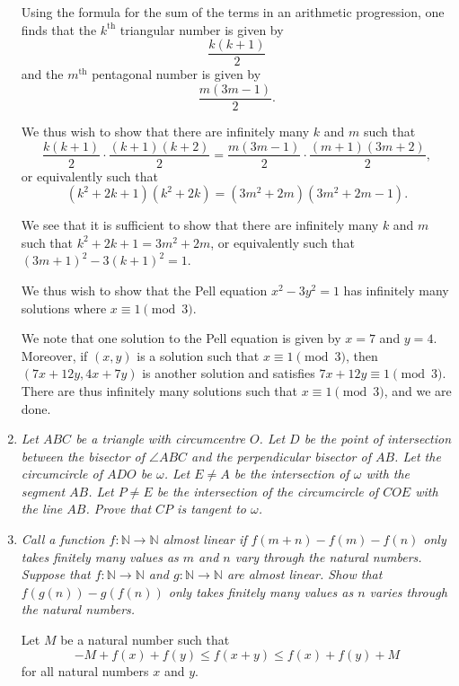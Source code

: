 \documentclass{article}
\begin{document}
\begin{enumerate}[1.]
Using the formula for the sum of the terms in an arithmetic progression, one finds that the $k^\text{th}$ triangular number is given by
\[
	\frac{k(k + 1)}{2}
\]
and the $m^\text{th}$ pentagonal number is given by
\[
	\frac{m(3m - 1)}{2}.
\]

We thus wish to show that there are infinitely many $k$ and $m$ such that
\[
	\frac{k(k + 1)}{2} \cdot \frac{(k + 1)(k + 2)}{2} = \frac{m(3m - 1)}{2} \cdot \frac{(m + 1)(3m + 2)}{2},
\]
or equivalently such that
\[
	(k^2 + 2k + 1)(k^2 + 2k) = (3m^2 + 2m)(3m^2 + 2m - 1).
\]

We see that it is sufficient to show that there are infinitely many $k$ and $m$ such that $k^2 + 2k + 1 = 3m^2 + 2m$, or equivalently such that ${(3m + 1)}^2 - 3{(k + 1)}^2 = 1$.

We thus wish to show that the Pell equation $x^2 - 3y^2 = 1$ has infinitely many solutions where $x \equiv 1 \pmod 3$.

We note that one solution to the Pell equation is given by $x = 7$ and $y = 4$. Moreover, if $(x, y)$ is a solution such that $x \equiv 1 \pmod 3$, then $(7x + 12y, 4x + 7y)$ is another solution and satisfies $7x + 12y \equiv 1 \pmod 3$. There are thus infinitely many solutions such that $x \equiv 1 \pmod 3$, and we are done.

\vspace{6pt}
\item %
{\itshape Let $ABC$ be a triangle with circumcentre $O$. Let $D$ be the point of intersection between the bisector of $\angle ABC$ and the perpendicular bisector of $AB$. Let the circumcircle of $ADO$ be $\omega$. Let $E\neq A$ be the intersection of $\omega$ with the segment $AB$. Let $P\neq E$ be the intersection of the circumcircle of $COE$ with the line $AB$. Prove that $CP$ is tangent to $\omega$.}


\vspace{6pt}
\item %
{\itshape Call a function $f : \mathbb{N} \to \mathbb{N}$ \emph{almost linear} if $f(m + n) - f(m) - f(n)$ only takes finitely many values as $m$ and $n$ vary through the natural numbers. Suppose that $f : \mathbb{N} \to \mathbb{N}$ and $g : \mathbb{N} \to \mathbb{N}$ are almost linear. Show that $f(g(n)) - g(f(n))$ only takes finitely many values as $n$ varies through the natural numbers.}

Let $M$ be a natural number such that
\[
	-M + f(x) + f(y) \leq f(x + y) \leq f(x) + f(y) + M
\]
for all natural numbers $x$ and $y$.


\end{enumerate}
\end{document}
